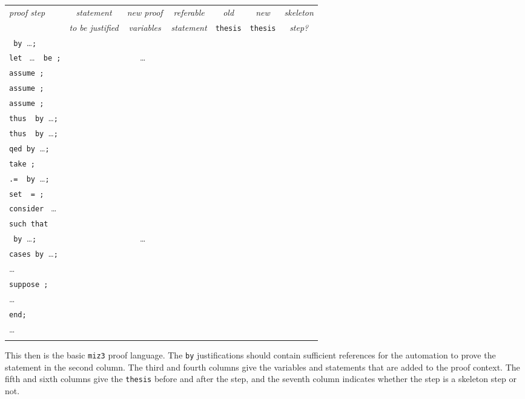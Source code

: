 \documentclass{LMCS}
\let\xmedskip=\medskip
\begin{document}
\xmedskip
\begin{center}
\begin{tabular}{lcccccc}
\emph{proof step} & \emph{statement} & \emph{new proof} & \emph{referable} & \emph{old} & \emph{new} & \emph{skeleton} \\
 & \emph{to be justified} & \emph{variables} & \emph{statement} & \texttt{thesis} & \texttt{thesis} & \emph{step?} \\
\noalign{\smallskip}
\hline
\noalign{\medskip}
\texttt{ by }\dots\texttt{;} &  & &  &  &  &  \\
\noalign{\medskip}
\texttt{let } \dots\ {\tt\ be }\texttt{;} & &  \dots\  & &  &  &  \\
\noalign{\medskip}
\texttt{assume }\texttt{;} & & &  &  &  &  \\
\noalign{\medskip}
\texttt{assume }\texttt{;} & & &  &  &  &  \\
\noalign{\medskip}
\texttt{assume }\texttt{;} & & &  &  &  &  \\
\noalign{\medskip}
\texttt{thus }\texttt{ by }\dots\texttt{;} &  & &   &  &  &  \\
\noalign{\medskip}
\texttt{thus }\texttt{ by }\dots\texttt{;} &  & &  &  &  &  \\
\noalign{\medskip}
\texttt{qed by }\dots\texttt{;} &  & & &  & &  \\
\noalign{\medskip}
\texttt{take }\texttt{;} & & & &  &  &  \\
\noalign{\medskip}
\texttt{.= }\texttt{ by }\dots\texttt{;} &  & &  &  &  &  \\
\noalign{\medskip}
\texttt{set }\texttt{ = }\texttt{;} & &  &  &  &  &  \\
\noalign{\smallskip}
\hline
\noalign{\smallskip}
\texttt{consider } \dots\  \\
 \texttt{such that} \\
 \texttt{ by }\dots\texttt{;} &  &  \dots\  &  &  &  &  \\
\noalign{\smallskip}
\hline
\noalign{\smallskip}
\texttt{cases by }\dots\texttt{;} &  & & &  \\
\dots \\
\texttt{suppose }\texttt{;} & & &  & &  &  \\
 \dots \\
\texttt{end;} \\
\dots \\
\noalign{\smallskip}
\hline
\end{tabular}
\end{center}
\xmedskip
\xmedskip
\noindent
This then is the basic \texttt{miz3} proof language.
The \texttt{by} justifications should contain sufficient references for
the automation to prove the statement in the second column.
The third and fourth columns give the variables and statements that
are added to the proof context.
The fifth and sixth columns give the \texttt{thesis} before and
after the step, and the seventh column
indicates whether the step is a skeleton step or not.
\end{document}
